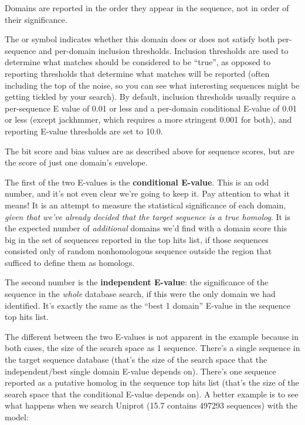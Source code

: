 Domains are reported in the order they appear in the sequence, not in
order of their significance.

The \ccode{!} or  symbol indicates whether this domain does
or does not satisfy both per-sequence and per-domain inclusion
thresholds. Inclusion thresholds are used to determine what matches
should be considered to be ``true'', as opposed to reporting
thresholds that determine what matches will be reported (often
including the top of the noise, so you can see what interesting
sequences might be getting tickled by your search). By default,
inclusion thresholds usually require a per-sequence E value of 0.01 or
less and a per-domain conditional E-value of 0.01 or less (except
jackhmmer, which requires a more stringent 0.001 for both), and
reporting E-value thresholds are set to 10.0.

The bit score and bias values are as described above for sequence
scores, but are the score of just one domain's envelope. 

The first of the two E-values is the \textbf{conditional
E-value}. This is an odd number, and it's not even clear we're going
to keep it. Pay attention to what it means! It is an attempt to
measure the statistical significance of each domain, \emph{given that
we've already decided that the target sequence is a true homolog}.  It
is the expected number of \emph{additional} domains we'd find with a
domain score this big in the set of sequences reported in the top hits
list, if those sequences consisted only of random nonhomologous
sequence outside the region that sufficed to define them as homologs. 

The second number is the \textbf{independent E-value}: the
significance of the sequence in the \emph{whole} database search, if
this were the only domain we had identified. It's exactly the same as
the ``best 1 domain'' E-value in the sequence top hits list.

The different between the two E-values is not apparent in the
 example because in both cases, the size of the
search space as 1 sequence. There's a single sequence in the target
sequence database (that's the size of the search space that the
independent/best single domain E-value depends on). There's one
sequence reported as a putative homolog in the sequence top hits list
(that's the size of the search space that the conditional E-value
depends on). A better example is to see what happens when we search
Uniprot (15.7 contains 497293 sequences) with the  model:

